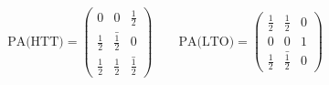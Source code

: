 \[
    \text{PA(HTT)} =  
    \begin{pmatrix}
    0 & 0 & \frac{1}{2} \\
    \frac{1}{2} & \bar{\frac{1}{2}} & 0 \\
    \frac{1}{2} & \frac{1}{2} & \bar{\frac{1}{2}}
    \end{pmatrix}
    \qquad
    \text{PA(LTO)} =  
    \begin{pmatrix}
    \frac{1}{2} & \frac{1}{2} & 0 \\
    0 & 0 & 1 \\
    \frac{1}{2} & \bar{\frac{1}{2}} & 0
    \end{pmatrix}
\]